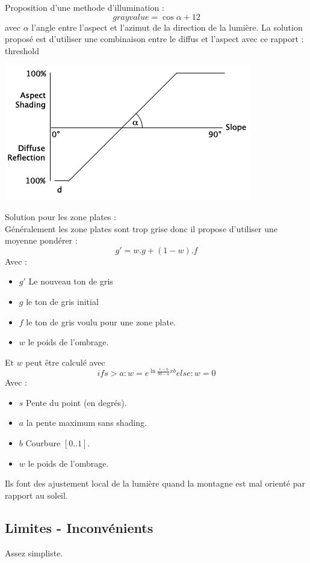 \documentclass[a4paper]{article}
\begin{document}
Proposition d'une methode d'illumination : 
\[gray value = \cos\alpha + 12 \]
avec $\alpha$ l'angle entre l'aspect et l'azimut de la direction de la lumière.
La solution proposé est d'utiliser une combinaison entre le diffus et l'aspect avec ce rapport : 
threshold
\begin{center}
\includegraphics[scale=0.5]{diagram_diffuse_aspect.png}
\end{center}

Solution pour les zone plates :\\
Généralement les zone plates sont trop grise donc il propose d'utiliser une moyenne pondérer :
\[ g' = w.g + (1-w) .f \]
Avec :
\begin{itemize}
\item $g'$ Le nouveau ton de gris
\item $g$ le ton de gris initial
\item $f$ le ton de gris voulu pour une zone plate. 
\item $w$ le poids de l'ombrage.
\end{itemize}

Et $w$ peut être calculé avec 
\[if s > a : w = e^{\ln\frac{s-a}{90-a} x b} else : w = 0\]
Avec : 
\begin{itemize}
\item $s$ Pente du point (en degrés). 
\item $a$ la pente maximum sans shading. 
\item $b$ Courbure $[0..1]$. 
\item $w$ le poids de l'ombrage.
\end{itemize}



Ils font des ajustement local de la lumière quand la montagne est mal orienté par rapport au soleil. 

\subsection{Limites - Inconvénients}
Assez simpliste.
\end{document}
